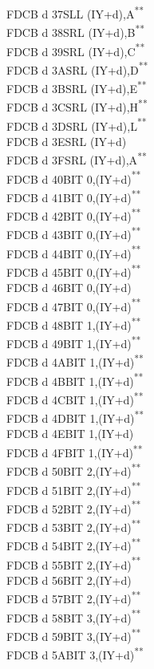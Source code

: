 \documentclass[12pt,twoside,openright,a4paper]{book}
\newcommand{\UNDOC}{\textnormal{\textsuperscript{**}}}
\begin{document}
\begin{multicols}{3}
{\begin{tabbing}
	FDCB d 37\>SLL (IY+d),A\UNDOC\\
	FDCB d 38\>SRL (IY+d),B\UNDOC\\
	FDCB d 39\>SRL (IY+d),C\UNDOC\\
	FDCB d 3A\>SRL (IY+d),D\UNDOC\\
	FDCB d 3B\>SRL (IY+d),E\UNDOC\\
	FDCB d 3C\>SRL (IY+d),H\UNDOC\\
	FDCB d 3D\>SRL (IY+d),L\UNDOC\\
	FDCB d 3E\>SRL (IY+d)\\
	FDCB d 3F\>SRL (IY+d),A\UNDOC\\
	FDCB d 40\>BIT 0,(IY+d)\UNDOC\\
	FDCB d 41\>BIT 0,(IY+d)\UNDOC\\
	FDCB d 42\>BIT 0,(IY+d)\UNDOC\\
	FDCB d 43\>BIT 0,(IY+d)\UNDOC\\
	FDCB d 44\>BIT 0,(IY+d)\UNDOC\\
	FDCB d 45\>BIT 0,(IY+d)\UNDOC\\
	FDCB d 46\>BIT 0,(IY+d)\\
	FDCB d 47\>BIT 0,(IY+d)\UNDOC\\
	FDCB d 48\>BIT 1,(IY+d)\UNDOC\\
	FDCB d 49\>BIT 1,(IY+d)\UNDOC\\
	FDCB d 4A\>BIT 1,(IY+d)\UNDOC\\
	FDCB d 4B\>BIT 1,(IY+d)\UNDOC\\
	FDCB d 4C\>BIT 1,(IY+d)\UNDOC\\
	FDCB d 4D\>BIT 1,(IY+d)\UNDOC\\
	FDCB d 4E\>BIT 1,(IY+d)\\
	FDCB d 4F\>BIT 1,(IY+d)\UNDOC\\
	FDCB d 50\>BIT 2,(IY+d)\UNDOC\\
	FDCB d 51\>BIT 2,(IY+d)\UNDOC\\
	FDCB d 52\>BIT 2,(IY+d)\UNDOC\\
	FDCB d 53\>BIT 2,(IY+d)\UNDOC\\
	FDCB d 54\>BIT 2,(IY+d)\UNDOC\\
	FDCB d 55\>BIT 2,(IY+d)\UNDOC\\
	FDCB d 56\>BIT 2,(IY+d)\\
	FDCB d 57\>BIT 2,(IY+d)\UNDOC\\
	FDCB d 58\>BIT 3,(IY+d)\UNDOC\\
	FDCB d 59\>BIT 3,(IY+d)\UNDOC\\
	FDCB d 5A\>BIT 3,(IY+d)\UNDOC\\

\end{tabbing}}
\end{multicols}
\end{document}
